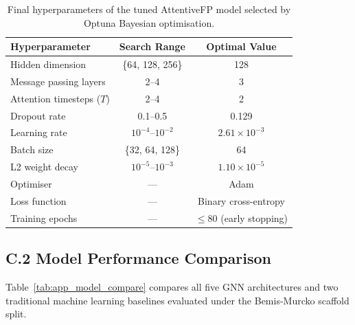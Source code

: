 \begin{table}[H]
\caption{Final hyperparameters of the tuned AttentiveFP
         model selected by Optuna Bayesian optimisation.}
\label{tab:app_hyperparams}
\centering
\begin{tabular}{@{}lcc@{}}
\toprule
\textbf{Hyperparameter} & \textbf{Search Range}
                        & \textbf{Optimal Value} \\
\midrule
Hidden dimension        & \{64, 128, 256\} & 128 \\
Message passing layers  & 2--4      & 3 \\
Attention timesteps ($T$) & 2--4   & 2 \\
Dropout rate            & 0.1--0.5  & 0.129 \\
Learning rate           & $10^{-4}$--$10^{-2}$ & $2.61\times10^{-3}$ \\
Batch size              & \{32, 64, 128\} & 64 \\
L2 weight decay         & $10^{-5}$--$10^{-3}$ & $1.10\times10^{-5}$ \\
Optimiser               & ---       & Adam \\
Loss function           & ---       & Binary cross-entropy \\
Training epochs         & ---       & $\leq$80 (early stopping) \\
\bottomrule
\end{tabular}
\end{table}

\subsection*{C.2 Model Performance Comparison}

Table~\ref{tab:app_model_compare} compares all five GNN
architectures and two traditional machine learning
baselines evaluated under the Bemis-Murcko scaffold split.

